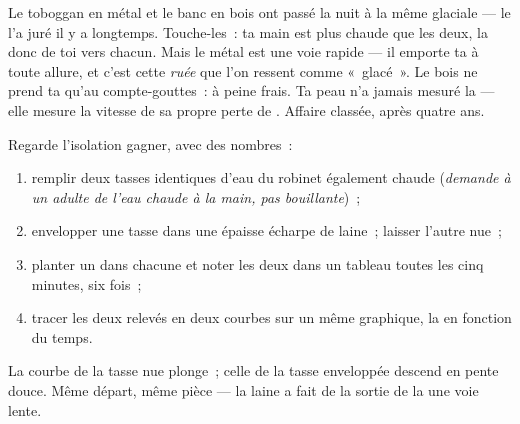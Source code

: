 \begin{example}\label{ex:g5:heat-and-insulation:slide}
Le toboggan en métal et le banc en bois ont passé la nuit à la même
 glaciale --- le  l'a juré il y a longtemps.
Touche-les~: ta main est plus chaude que les deux, la  
donc de toi vers chacun. Mais le métal est une voie rapide --- il
emporte ta  à toute allure, et c'est cette \emph{ruée} que
l'on ressent comme «~glacé~». Le bois ne prend ta  qu'au
compte-gouttes~: à peine frais. Ta peau n'a jamais mesuré la
 --- elle mesure la vitesse de sa propre perte de .
Affaire classée, après quatre ans.
\end{example}

\begin{method}\label{met:g5:heat-and-insulation:race}
Regarde l'isolation gagner, avec des nombres~:
\begin{enumerate}
  \item remplir deux tasses identiques d'eau du robinet également
        chaude (\emph{demande à un adulte de l'eau chaude à la main,
        pas bouillante})~;
  \item envelopper une tasse dans une épaisse écharpe de laine~;
        laisser l'autre nue~;
  \item planter un  dans chacune et noter les deux
         dans un tableau toutes les cinq minutes, six
        fois~;
  \item tracer les deux relevés en deux courbes sur un même
        graphique, la  en fonction du temps.
\end{enumerate}
La courbe de la tasse nue plonge~; celle de la tasse enveloppée
descend en pente douce. Même départ, même pièce --- la laine a fait
de la sortie de la  une voie lente.
\end{method}

